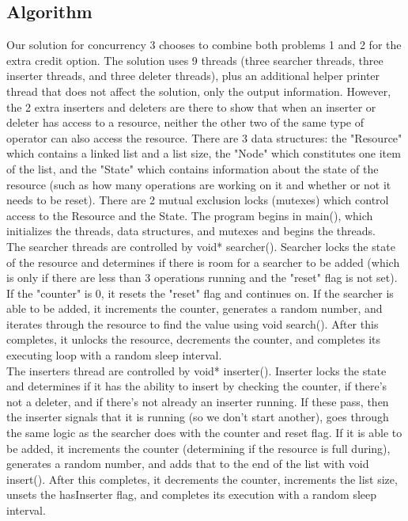 \documentclass[onecolumn, draftclsnofoot,10pt, compsoc]{IEEEtran}
\begin{document}
\begin{singlespace}
\subsection*{Algorithm}
    Our solution for concurrency 3 chooses to combine both problems 1 and 2 for the extra credit option. The solution uses 9 threads (three searcher threads, three inserter threads, and three deleter threads), plus an additional helper printer thread that does not affect the solution, only the output information. However, the 2 extra inserters and deleters are there to show that when an inserter or deleter has access to a resource, neither the other two of the same type of operator can also access the resource. There are 3 data structures: the "Resource" which contains a linked list and a list size, the "Node" which constitutes one item of the list, and the "State" which contains information about the state of the resource (such as how many operations are working on it and whether or not it needs to be reset). There are 2 mutual exclusion locks (mutexes) which control access to the Resource and the State. The program begins in main(), which initializes the threads, data structures, and mutexes and begins the threads. \\
    The searcher threads are controlled by void* searcher(). Searcher locks the state of the resource and determines if there is room for a searcher to be added (which is only if there are less than 3 operations running and the "reset" flag is not set). If the "counter" is 0, it resets the "reset" flag and continues on. If the searcher is able to be added, it increments the counter, generates a random number, and iterates through the resource to find the value using void search(). After this completes, it unlocks the resource, decrements the counter, and completes its executing loop with a random sleep interval. \\
    The inserters thread are controlled by void* inserter(). Inserter locks the state and determines if it has the ability to insert by checking the counter, if there's not a deleter, and if there's not already an inserter running. If these pass, then the inserter signals that it is running (so we don't start another), goes through the same logic as the searcher does with the counter and reset flag. If it is able to be added, it increments the counter (determining if the resource is full during), generates a random number, and adds that to the end of the list with void insert(). After this completes, it decrements the counter, increments the list size, unsets the hasInserter flag, and completes its execution with a random sleep interval. \\

\end{singlespace}
\end{document}
